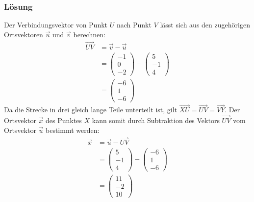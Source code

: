 \subsubsection{Lösung}
Der Verbindungsvektor von Punkt $U$ nach Punkt $V$ lässt sich aus den
zugehörigen Ortsvektoren $\vec{u}$ und $\vec{v}$ berechnen:
\begin{align*}
    \vec{UV} & = \vec{v} - \vec{u}              \\
             & = \begin{pmatrix}
                     -1 \\ 0 \\ -2
                 \end{pmatrix} - \begin{pmatrix}
                                     5 \\ -1 \\ 4
                                 \end{pmatrix} \\
             & = \begin{pmatrix}
                     -6 \\ 1 \\ -6
                 \end{pmatrix}
\end{align*}
Da die Strecke in drei gleich lange Teile unterteilt ist, gilt $\vec{XU} = \vec{UV} = \vec{VY}$.
\newline
\newline
Der Ortsvektor $\vec{x}$ des Punktes $X$ kann somit durch Subtraktion des Vektors $\vec{UV}$ vom Ortsvektor $\vec{u}$ bestimmt werden:
\begin{align*}
    \vec{x} & = \vec{u} - \vec{UV}             \\
            & = \begin{pmatrix}
                    5 \\ -1 \\ 4
                \end{pmatrix} - \begin{pmatrix}
                                    -6 \\ 1 \\ -6
                                \end{pmatrix} \\
            & = \begin{pmatrix}
                    11 \\ -2 \\ 10
                \end{pmatrix}
\end{align*}
